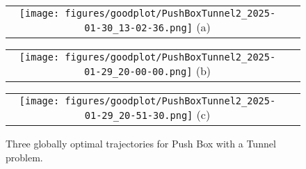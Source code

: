 
\begin{figure}[htbp]
    \centering
    \begin{minipage}{\columnwidth}
        \centering
        \begin{tabular}{cc}
            \begin{minipage}{0.5\columnwidth}
                \centering
                \texttt{[image: figures/goodplot/PushBoxTunnel2\_2025-01-30\_13-02-36.png]}
                (a)
            \end{minipage}
        \end{tabular}
    \end{minipage}

    \begin{minipage}{\columnwidth}
        \centering
        \begin{tabular}{cc}
            \begin{minipage}{0.5\columnwidth}
                \centering
                \texttt{[image: figures/goodplot/PushBoxTunnel2\_2025-01-29\_20-00-00.png]}
                (b) 
            \end{minipage}
        \end{tabular}
    \end{minipage}

    \begin{minipage}{\columnwidth}
        \centering
        \begin{tabular}{cc}
            \begin{minipage}{0.5\columnwidth}
                \centering
                \texttt{[image: figures/goodplot/PushBoxTunnel2\_2025-01-29\_20-51-30.png]}
                (c) 
            \end{minipage}
        \end{tabular}
    \end{minipage}

    \caption{Three globally optimal trajectories for Push Box with a Tunnel problem. \label{fig:exp:PushBox}}
\end{figure}
